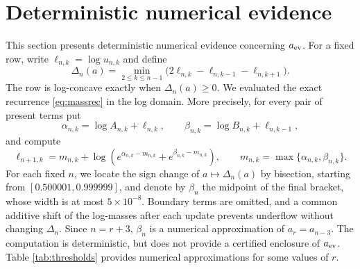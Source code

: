 \documentclass[11pt]{article}
\numberwithin{equation}{section}
\theoremstyle{remark}
\begin{document}
\section{Deterministic numerical evidence}

This section presents deterministic numerical evidence concerning $a_{\rm ev}$. For a fixed row, write
$\ell_{n,k}=\log u_{n,k}$ and define
\begin{equation}\label{eq:numerical-gap}
 \Delta_n(a)=\min_{2\leq k\leq n-1}
 \bigl(2\ell_{n,k}-\ell_{n,k-1}-\ell_{n,k+1}\bigr).
\end{equation}
The row is log-concave exactly when $\Delta_n(a)\geq0$. We evaluated the exact
recurrence \eqref{eq:massrec} in the log domain. More precisely, for every pair
of present terms put
\[
 \alpha_{n,k}=\log A_{n,k}+\ell_{n,k},\qquad
 \beta_{n,k}=\log B_{n,k}+\ell_{n,k-1},
\]
and compute
\begin{equation}\label{eq:logsumexp}
 \ell_{n+1,k}=m_{n,k}+
 \log\!\left(e^{\alpha_{n,k}-m_{n,k}}+e^{\beta_{n,k}-m_{n,k}}\right),
 \qquad
 m_{n,k}=\max\{\alpha_{n,k},\beta_{n,k}\}.
\end{equation}
For each fixed \(n\), we locate the sign change of \(a\mapsto\Delta_n(a)\)
by bisection, starting from \([0.500001,0.999999]\), and denote by
\(\beta_n\) the midpoint of the final bracket, whose width is at most
\(5\times10^{-8}\). Boundary terms are omitted, and a common additive
shift of the log-masses after each update prevents underflow without
changing \(\Delta_n\). Since \(n=r+3\), \(\beta_n\) is a numerical
approximation of \(a_r=a_{n-3}\). The computation is
deterministic, but does not provide a certified enclosure of \(a_{\rm ev}\). Table \ref{tab:thresholds} provides numerical approximations for some values of $r$.
\end{document}
